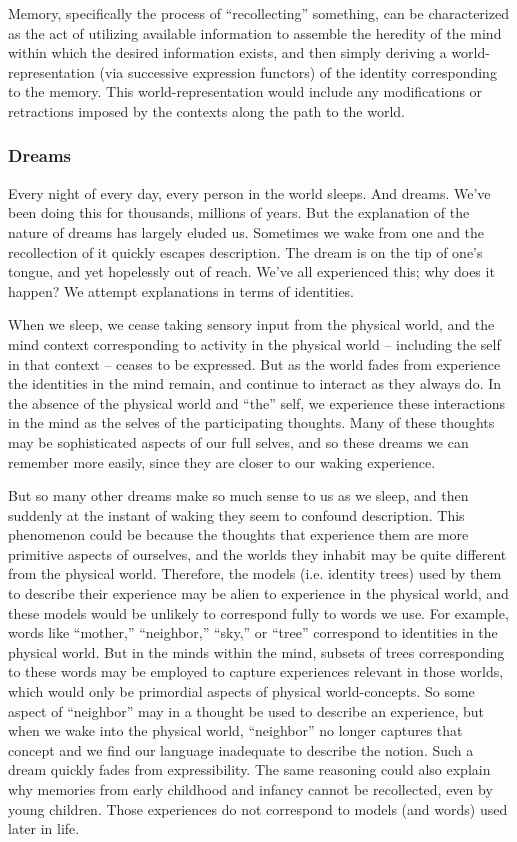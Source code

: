 \documentclass[pra,twocolumn,groupedaddress,10pt]{revtex4}
\theoremstyle{definition}
\begin{document}
Memory, specifically the process of ``recollecting'' something, can be characterized as the act of utilizing available information to assemble the heredity of the mind within which the desired information exists, and then simply deriving a world-representation (via successive expression functors) of the identity corresponding to the memory. This world-representation would include any modifications or retractions imposed by the contexts along the path to the world.

\subsubsection{Dreams} \label{sec:dreams}

Every night of every day, every person in the world sleeps. And dreams. We've been doing this for thousands, millions of years. But the explanation of the nature of dreams has largely eluded us. Sometimes we wake from one and the recollection of it quickly escapes description. The dream is on the tip of one's tongue, and yet hopelessly out of reach. We've all experienced this; why does it happen? We attempt explanations in terms of identities.

When we sleep, we cease taking sensory input from the physical world, and the mind context corresponding to activity in the physical world -- including the self in that context -- ceases to be expressed. But as the world fades from experience the identities in the mind remain, and continue to interact as they always do. In the absence of the physical world and ``the'' self, we experience these interactions in the mind as the selves of the participating thoughts. Many of these thoughts may be sophisticated aspects of our full selves, and so these dreams we can remember more easily, since they are closer to our waking experience.

But so many other dreams make so much sense to us as we sleep, and then suddenly at the instant of waking they seem to confound description. This phenomenon could be because the thoughts that experience them are more primitive aspects of ourselves, and the worlds they inhabit may be quite different from the physical world. Therefore, the models (i.e. identity trees) used by them to describe their experience may be alien to experience in the physical world, and these models would be unlikely to correspond fully to words we use. For example, words like ``mother,'' ``neighbor,'' ``sky,'' or ``tree'' correspond to identities in the physical world. But in the minds within the mind, subsets of trees corresponding to these words may be employed to capture experiences relevant in those worlds, which would only be primordial aspects of physical world-concepts. So some aspect of ``neighbor'' may in a thought be used to describe an experience, but when we wake into the physical world, ``neighbor'' no longer captures that concept and we find our language inadequate to describe the notion. Such a dream quickly fades from expressibility. The same reasoning could also explain why memories from early childhood and infancy cannot be recollected, even by young children. Those experiences do not correspond to models (and words) used later in life.
\end{document}
